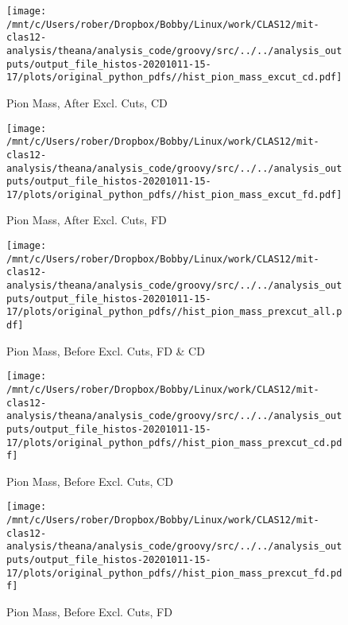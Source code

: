 \documentclass{article}
\begin{document}
\begin{landscape}
    \begin{figure}[h]
        \centering

        \texttt{[image: /mnt/c/Users/rober/Dropbox/Bobby/Linux/work/CLAS12/mit-clas12-analysis/theana/analysis\_code/groovy/src/../../analysis\_outputs/output\_file\_histos-20201011-15-17/plots/original\_python\_pdfs//hist\_pion\_mass\_excut\_cd.pdf]}
        \captionsetup{textformat=empty,labelformat=blank}
        \caption{Pion Mass, After Excl. Cuts, CD}
    \end{figure}
    \clearpage
    
    \begin{figure}[h]
        \centering

        \texttt{[image: /mnt/c/Users/rober/Dropbox/Bobby/Linux/work/CLAS12/mit-clas12-analysis/theana/analysis\_code/groovy/src/../../analysis\_outputs/output\_file\_histos-20201011-15-17/plots/original\_python\_pdfs//hist\_pion\_mass\_excut\_fd.pdf]}
        \captionsetup{textformat=empty,labelformat=blank}
        \caption{Pion Mass, After Excl. Cuts, FD}
    \end{figure}
    \clearpage
    
    \begin{figure}[h]
        \centering

        \texttt{[image: /mnt/c/Users/rober/Dropbox/Bobby/Linux/work/CLAS12/mit-clas12-analysis/theana/analysis\_code/groovy/src/../../analysis\_outputs/output\_file\_histos-20201011-15-17/plots/original\_python\_pdfs//hist\_pion\_mass\_prexcut\_all.pdf]}
        \captionsetup{textformat=empty,labelformat=blank}
        \caption{Pion Mass, Before Excl. Cuts, FD \& CD}
    \end{figure}
    \clearpage
    
    \begin{figure}[h]
        \centering

        \texttt{[image: /mnt/c/Users/rober/Dropbox/Bobby/Linux/work/CLAS12/mit-clas12-analysis/theana/analysis\_code/groovy/src/../../analysis\_outputs/output\_file\_histos-20201011-15-17/plots/original\_python\_pdfs//hist\_pion\_mass\_prexcut\_cd.pdf]}
        \captionsetup{textformat=empty,labelformat=blank}
        \caption{Pion Mass, Before Excl. Cuts, CD}
    \end{figure}
    \clearpage
    
    \begin{figure}[h]
        \centering

        \texttt{[image: /mnt/c/Users/rober/Dropbox/Bobby/Linux/work/CLAS12/mit-clas12-analysis/theana/analysis\_code/groovy/src/../../analysis\_outputs/output\_file\_histos-20201011-15-17/plots/original\_python\_pdfs//hist\_pion\_mass\_prexcut\_fd.pdf]}
        \captionsetup{textformat=empty,labelformat=blank}
        \caption{Pion Mass, Before Excl. Cuts, FD}
    \end{figure}
    \clearpage
    

\end{landscape}
\end{document}

